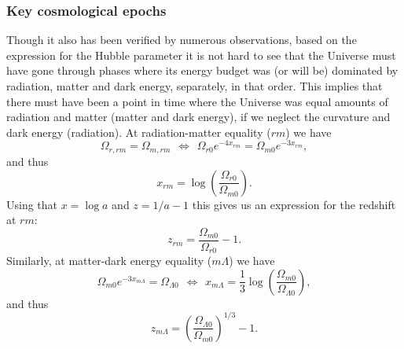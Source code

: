 \documentclass{aa}
\numberwithin{equation}{section}
\numberwithin{table}{section}
\numberwithin{figure}{section}
\begin{document}
\subsubsection{Key cosmological epochs}
Though it also has been verified by numerous observations, based on the expression for the Hubble parameter it is not hard to see that the Universe must have gone through phases where its energy budget was (or will be) dominated by radiation, matter and dark energy, separately, in that order. This implies that there must have been a point in time where the Universe was equal amounts of radiation and matter (matter and dark energy), if we neglect the curvature and dark energy (radiation). At radiation-matter equality ($rm$) we have
\begin{equation}
    \Omega_{r,rm} = \Omega_{m,rm} 
    \hspace{5pt}\Leftrightarrow\hspace{5pt} 
    \Omega_{r0}e^{-4x_{rm}} = \Omega_{m0}e^{-3x_{rm}}, 
\end{equation}
and thus
\begin{equation}
  x_{rm} = \log\left(\frac{\Omega_{r0}}{\Omega_{m0}}\right).
\end{equation}
Using that $x = \log a$ and $z = 1/a - 1$ this gives us an expression for the redshift at $rm$:
\begin{equation}
  z_{rm} = \frac{\Omega_{m0}}{\Omega_{r0}} - 1.
\end{equation} 
Similarly, at matter-dark energy equality ($m\Lambda$) we have
\begin{equation}
  \Omega_{m0}e^{-3x_{m\Lambda}} = \Omega_{\Lambda0}
  \hspace{5pt}\Leftrightarrow\hspace{5pt}
  x_{m\Lambda} = \frac{1}{3}\log\left(\frac{\Omega_{m0}}{\Omega_{\Lambda0}}\right),
\end{equation}
and thus
\begin{equation}
  z_{m\Lambda} = \left(\frac{\Omega_{\Lambda0}}{\Omega_{m0}}\right)^{1/3} - 1.
\end{equation}
\end{document}
